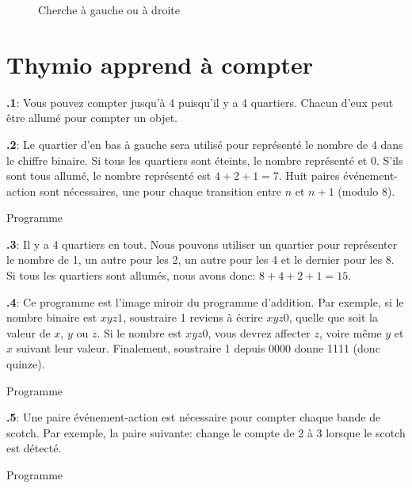 \documentclass[12pt,a4paper,english]{article}
\begin{document}
\begin{figure}
\begin{center}
\caption{Cherche à gauche ou à droite}\label{fig.follow1}
\end{center}
\end{figure}

\section{Thymio apprend à compter}

\textbf{\thesection.1}:
Vous pouvez compter jusqu'à 4 puisqu'il y a 4 quartiers. Chacun d'eux peut être allumé pour compter un objet.

\textbf{\thesection.2}:
Le quartier d'en bas à gauche sera utilisé pour représenté le nombre de 4 dans le chiffre binaire. Si tous les quartiers sont éteints, le nombre représenté et 0. S'ils sont tous allumé, le nombre représenté est $4+2+1=7$. Huit paires événement-action sont nécessaires, une pour chaque transition entre $n$ et $n+1$ (modulo 8).

{\raggedleft \hfill Programme }

\textbf{\thesection.3}:
Il y a 4 quartiers en tout. Nous pouvons utiliser un quartier pour représenter le nombre de 1, un autre pour les 2, un autre pour les 4 et le dernier pour les 8. Si tous les quartiers sont allumés, nous avons donc: $8+4+2+1 = 15$.


\textbf{\thesection.4}:
Ce programme est l'image miroir du programme d'addition. Par exemple, si le nombre binaire est $xyz1$, soustraire 1 reviens à écrire $xyz0$, quelle que soit la valeur de $x$, $y$ ou $z$. Si le nombre est $xyz0$, vous devrez affecter $z$, voire même $y$ et $x$ suivant leur valeur. Finalement, soustraire 1 depuis 0000 donne 1111 (donc quinze).

{\raggedleft \hfill Programme }

\textbf{\thesection.5}:
Une paire événement-action est nécessaire pour compter chaque bande de scotch. Par exemple, la paire suivante:  change le compte de 2 à 3 lorsque le scotch est détecté.

{\raggedleft \hfill Programme }
\end{document}
